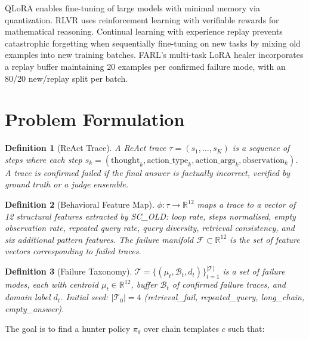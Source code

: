 \documentclass[11pt,a4paper]{article}
\newtheorem{definition}{Definition}
\begin{document}
QLoRA \cite{dettmers2023qlora} enables fine-tuning of large models with
minimal memory via quantization. RLVR \cite{deepseek2025math} uses
reinforcement learning with verifiable rewards for mathematical reasoning.
Continual learning with experience replay \cite{rolnick2019experience}
prevents catastrophic forgetting when sequentially fine-tuning on new tasks
by mixing old examples into new training batches. FARL's multi-task LoRA
healer incorporates a replay buffer maintaining 20 examples per confirmed
failure mode, with an 80/20 new/replay split per batch.

\section{Problem Formulation}
\label{sec:formulation}

\begin{definition}[ReAct Trace]
A ReAct trace $\tau = (s_1, \ldots, s_K)$ is a sequence of steps where each
step $s_k = (\text{thought}_k, \text{action\_type}_k, \text{action\_args}_k,
\text{observation}_k)$. A trace is \emph{confirmed failed} if the final answer
is factually incorrect, verified by ground truth or a judge ensemble.
\end{definition}

\begin{definition}[Behavioral Feature Map]
$\phi: \tau \to \mathbb{R}^{12}$ maps a trace to a vector of 12 structural
features extracted by SC\_OLD: loop rate, steps normalised, empty observation
rate, repeated query rate, query diversity, retrieval consistency, and six
additional pattern features. The \emph{failure manifold} $\mathcal{F} \subset
\mathbb{R}^{12}$ is the set of feature vectors corresponding to failed traces.
\end{definition}

\begin{definition}[Failure Taxonomy]
$\mathcal{T} = \{(\mu_t, \mathcal{B}_t, d_t)\}_{t=1}^{|\mathcal{T}|}$ is a
set of failure modes, each with centroid $\mu_t \in \mathbb{R}^{12}$, buffer
$\mathcal{B}_t$ of confirmed failure traces, and domain label $d_t$.
Initial seed: $|\mathcal{T}_0| = 4$ (retrieval\_fail, repeated\_query,
long\_chain, empty\_answer).
\end{definition}

The goal is to find a hunter policy $\pi_\theta$ over chain templates $c$
such that:
\end{document}
